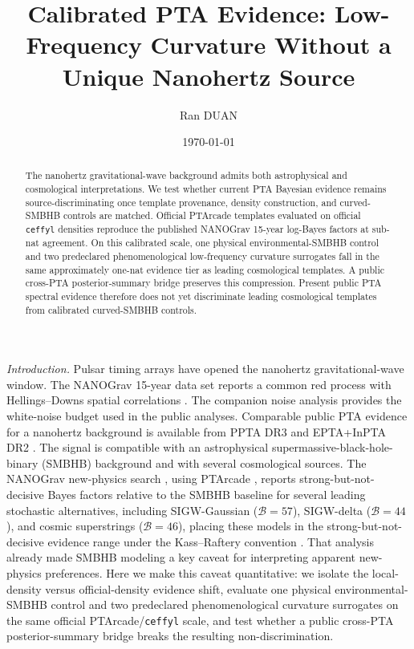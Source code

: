 \documentclass[aps,prl,reprint,superscriptaddress,nofootinbib,floatfix]{revtex4-2}
\begin{document}
\title{Calibrated PTA Evidence: Low-Frequency Curvature Without a Unique Nanohertz Source}

\author{Ran DUAN}
\date{\today}

\begin{abstract}
The nanohertz gravitational-wave background admits both astrophysical
and cosmological interpretations.  We test whether current PTA
Bayesian evidence remains source-discriminating once template
provenance, density construction, and curved-SMBHB controls are matched.
Official PTArcade templates evaluated on official \texttt{ceffyl}
densities reproduce the published NANOGrav 15-year log-Bayes factors at
sub-nat agreement.  On this calibrated scale, one physical
environmental-SMBHB control and two predeclared phenomenological
low-frequency curvature surrogates fall in the same approximately
one-nat evidence tier as leading cosmological templates.  A public
cross-PTA posterior-summary bridge preserves this compression.  Present
public PTA spectral evidence therefore does not yet discriminate leading
cosmological templates from calibrated curved-SMBHB controls.
\end{abstract}

\maketitle

\emph{Introduction.}
Pulsar timing arrays have opened the nanohertz gravitational-wave
window.  The NANOGrav 15-year data set reports a common red process with
Hellings--Downs spatial correlations \cite{NANOGrav_15yr_GWB}.  The
companion noise analysis \cite{NANOGrav_15yr_noise} provides the
white-noise budget used in the public analyses.  Comparable public PTA
evidence for a nanohertz background is available from PPTA DR3
\cite{PPTA_DR3} and EPTA+InPTA DR2 \cite{EPTA_InPTA_DR2}.  The signal
is compatible with an astrophysical supermassive-black-hole-binary
(SMBHB) background \cite{Phinney_2001} and with several cosmological
sources.
The NANOGrav
new-physics search \cite{NANOGrav_15yr_NewPhysics}, using PTArcade
\cite{PTArcade_2023}, reports strong-but-not-decisive Bayes factors
relative to the SMBHB baseline for several leading stochastic
alternatives, including SIGW-Gaussian ($\mathcal{B}=57$), SIGW-delta
($\mathcal{B}=44$), and cosmic superstrings ($\mathcal{B}=46$),
placing these models in the strong-but-not-decisive evidence range
under the Kass--Raftery convention \cite{Kass_Raftery_1995}.
That analysis already made SMBHB modeling a key caveat for interpreting
apparent new-physics preferences.  Here we make this caveat quantitative:
we isolate the local-density versus official-density evidence shift,
evaluate one physical environmental-SMBHB control and two predeclared
phenomenological curvature surrogates on the same official
PTArcade/\texttt{ceffyl} scale, and test whether a public cross-PTA
posterior-summary bridge breaks the resulting non-discrimination.
\end{document}

